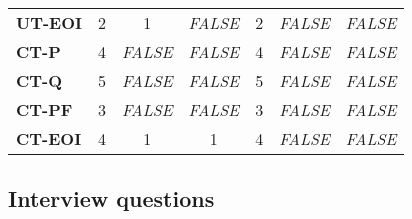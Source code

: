 \documentclass[final_report_innit.tex]{subfiles}
\begin{document}
\begin{table}
\begin{tabular}[b]{l | c | c | c | c | c | c}
	\textbf{UT-EOI} & 2 & 1 & \textit{FALSE} & 2 & \textit{FALSE} & \textit{FALSE} \\ %
	\textbf{CT-P} & 4 & \textit{FALSE} & \textit{FALSE} & 4 & \textit{FALSE} & \textit{FALSE} \\ %
	\textbf{CT-Q} & 5 & \textit{FALSE} & \textit{FALSE} & 5 & \textit{FALSE} & \textit{FALSE} \\ %
	\textbf{CT-PF} & 3 & \textit{FALSE} & \textit{FALSE} & 3 & \textit{FALSE} & \textit{FALSE} \\ %
	\textbf{CT-EOI} & 4 & 1 & 1 & 4 & \textit{FALSE} & \textit{FALSE} \\ %
\end{tabular}
\end{table}

\clearpage
\subsection{Interview questions}
\end{document}
